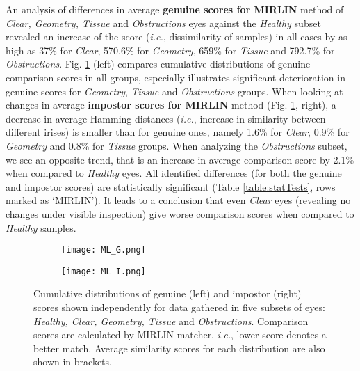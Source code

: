 \documentclass[conference]{IEEEtran}
\begin{document}
An analysis of differences in average {\bf genuine scores for MIRLIN} method of \emph{Clear, Geometry, Tissue} and \emph{Obstructions} eyes against the \emph{Healthy} subset revealed an increase of the score (\emph{i.e.}, dissimilarity of samples) in all cases by as high as 37\% for \emph{Clear}, 570.6\% for \emph{Geometry}, 659\% for \emph{Tissue} and 792.7\% for \emph{Obstructions}. Fig. \ref{fig:results_mirlin} (left) compares cumulative distributions of genuine comparison scores in all groups, especially illustrates significant deterioration in genuine scores for \emph{Geometry}, \emph{Tissue} and \emph{Obstructions} groups. When looking at changes in average {\bf impostor scores for MIRLIN} method (Fig. \ref{fig:results_mirlin}, right), a decrease in average Hamming distances (\emph{i.e.}, increase in similarity between different irises) is smaller than for genuine ones, namely 1.6\% for \emph{Clear}, 0.9\% for \emph{Geometry} and 0.8\% for \emph{Tissue} groups. When analyzing the \emph{Obstructions} subset, we see an opposite trend, that is an increase in average comparison score by 2.1\% when compared to \emph{Healthy} eyes. All identified differences (for both the genuine and impostor scores) are statistically significant (Table \ref{table:statTests}, rows marked as `MIRLIN'). It leads to a conclusion that even \emph{Clear} eyes (revealing no changes under visible inspection) give worse comparison scores when compared to \emph{Healthy} samples.

\begin{figure}[!htb]
\centering
\begin{subfigure}{0.25\textwidth}
  \centering
  \texttt{[image: ML\_G.png]}
\end{subfigure}%
\begin{subfigure}{0.25\textwidth}
  \centering
  \texttt{[image: ML\_I.png]}
\end{subfigure}
\caption{Cumulative distributions of genuine (left) and impostor (right) scores shown independently for data gathered in five subsets of eyes: \emph{Healthy, Clear, Geometry, Tissue} and \emph{Obstructions}. Comparison scores are calculated by MIRLIN matcher, \emph{i.e.}, lower score denotes a better match. Average similarity scores for each distribution are also shown in brackets.}
\label{fig:results_mirlin}
\end{figure} 
\end{document}
